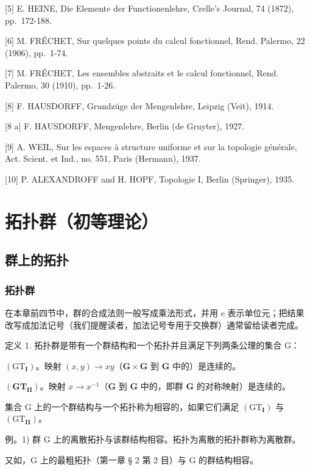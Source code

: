 {[}5{]} E. HEINE, Die Elemente der Functionenlehre, Crelle's Journal, 74 (1872), pp.~172-188.

{[}6{]} M. FRÉCHET, Sur quelques points du calcul fonctionnel, Rend. Palermo, 22 (1906), pp.~1-74.

{[}7{]} M. FRÉCHET, Les ensembles abstraits et le calcul fonctionnel, Rend. Palermo, 30 (1910), pp.~1-26.

{[}8{]} F. HAUSDORFF, Grundzüge der Mengenlehre, Leipzig (Veit), 1914.

{[}8 a{]} F. HAUSDORFF, Mengenlehre, Berlin (de Gruyter), 1927.

{[}9{]} A. WEIL, Sur les espaces à structure uniforme et sur la topologie générale, Act. Scient. et Ind., no. 551, Paris (Hermann), 1937.

{[}10{]} P. ALEXANDROFF and H. HOPF, Topologie I, Berlin (Springer), 1935.

\chapter{拓扑群（初等理论）}

\section{群上的拓扑}

\subsection{拓扑群}

在本章前四节中，群的合成法则一般写成乘法形式，并用 e 表示单位元；把结果改写成加法记号（我们提醒读者，加法记号专用于交换群）通常留给读者完成。

定义 1. 拓扑群是带有一个群结构和一个拓扑并且满足下列两条公理的集合 G：

\((\mathrm{GT}_{\mathbf{I}})\)。映射 \((x, y) \to xy\)（\(\mathbf{G} \times \mathbf{G}\) 到 \(\mathbf{G}\) 中的）是连续的。

\((\mathbf{G}\mathbf{T}_{\mathbf{II}})\)。映射 \(x \to x^{-1}\)（\(\mathbf{G}\) 到 \(\mathbf{G}\) 中的，即群 \(\mathbf{G}\) 的对称映射）是连续的。

集合 G 上的一个群结构与一个拓扑称为相容的，如果它们满足 \((\mathrm{GT}_{\mathbf{I}})\) 与 \((\mathrm{GT}_{\mathbf{II}})\)。

例。1) 群 G 上的离散拓扑与该群结构相容。拓扑为离散的拓扑群称为离散群。

又如，G 上的最粗拓扑（第一章 § 2 第 2 目）与 G 的群结构相容。

